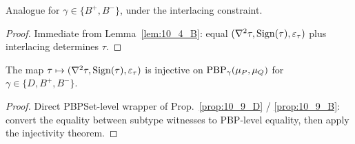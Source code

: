 \begin{proposition}
  \label{prop:10_9_B}
  \leanok
  Analogue for $\gamma \in \{B^+, B^-\}$, under the interlacing constraint.
\end{proposition}
\begin{proof}
  \leanok
  Immediate from Lemma~\ref{lem:10_4_B}: equal $(\nabla^2\tau, \mathrm{Sign}(\tau), \varepsilon_\tau)$ plus interlacing determines $\tau$.
\end{proof}


\begin{corollary}
  \label{cor:10_10}
  \leanok
  The map $\tau \mapsto (\nabla^2\tau, \mathrm{Sign}(\tau), \varepsilon_\tau)$ is injective on $\mathrm{PBP}_\gamma(\mu_P, \mu_Q)$ for $\gamma \in \{D, B^+, B^-\}$.
\end{corollary}
\begin{proof}
  \leanok
  Direct PBPSet-level wrapper of Prop.~\ref{prop:10_9_D} / \ref{prop:10_9_B}: convert the equality between subtype witnesses to PBP-level equality, then apply the injectivity theorem.
\end{proof}

